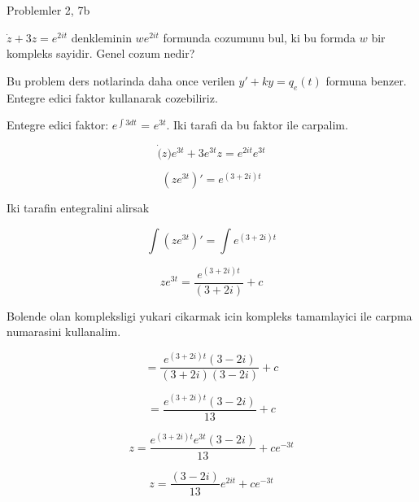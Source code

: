 \documentclass[12pt,fleqn]{article}
\begin{document}
Problemler 2, 7b

$\dot{z} + 3z = e^{2it}$ denkleminin $we^{2it}$ formunda cozumunu bul, ki
bu formda $w$ bir kompleks sayidir. Genel cozum nedir? 

Bu problem ders notlarinda daha once verilen $y' + ky = q_e(t)$ formuna
benzer. Entegre edici faktor kullanarak cozebiliriz. 

Entegre edici faktor: $e^{\int 3 dt}$ = $e^{3t}$. Iki tarafi da bu faktor
ile carpalim. 

\[ \dot(z)e^{3t} + 3e^{3t}z = e^{2it}e^{3t} \]

\[ (ze^{3t})' = e^{(3+2i)t} \]

Iki tarafin entegralini alirsak

\[ \int (ze^{3t})' = \int e^{(3+2i)t} \]

\[ ze^{3t} =  \frac {e^{(3+2i)t}}{(3+2i)} + c\]

Bolende olan kompleksligi yukari cikarmak icin kompleks tamamlayici ile
carpma numarasini kullanalim. 

\[ =  \frac {e^{(3+2i)t}(3-2i)}{(3+2i)(3-2i)} + c\]

\[ =  \frac {e^{(3+2i)t}(3-2i)}{13} + c\]

\[ z =  \frac {e^{(3+2i)t}e^{3t}(3-2i)}{13} + c e^{-3t}\]

\[ z = \frac {(3-2i)}{13} e^{2it} + c e^{-3t}\]
\end{document}
